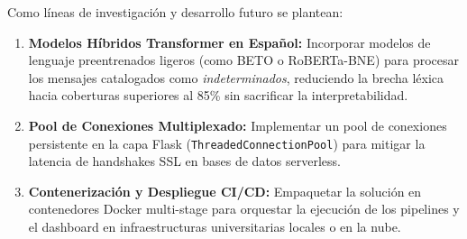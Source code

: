 Como líneas de investigación y desarrollo futuro se plantean:
\begin{enumerate}
  \item \textbf{Modelos Híbridos Transformer en Español:} Incorporar modelos de lenguaje preentrenados ligeros (como BETO o RoBERTa-BNE) para procesar los mensajes catalogados como \emph{indeterminados}, reduciendo la brecha léxica hacia coberturas superiores al 85\% sin sacrificar la interpretabilidad.
  \item \textbf{Pool de Conexiones Multiplexado:} Implementar un pool de conexiones persistente en la capa Flask (\texttt{ThreadedConnectionPool}) para mitigar la latencia de handshakes SSL en bases de datos serverless.
  \item \textbf{Contenerización y Despliegue CI/CD:} Empaquetar la solución en contenedores Docker multi-stage para orquestar la ejecución de los pipelines y el dashboard en infraestructuras universitarias locales o en la nube.
\end{enumerate}
